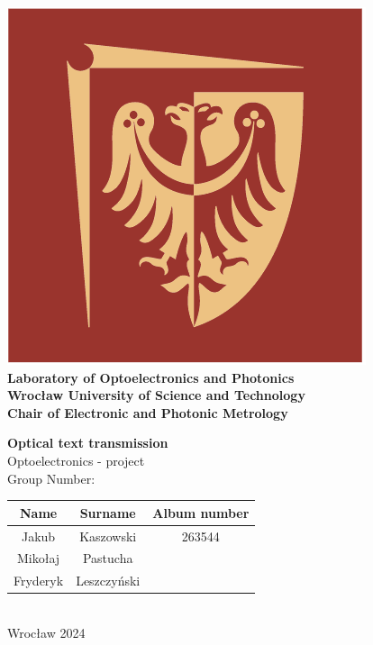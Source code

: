 \documentclass[12pt]{article}
\def\thetitle{Optical text transmission}
\begin{document}
	\begin{titlepage}
		\begin{center}
			\includegraphics[scale=0.3]{img/pwr.png}\\
			\vspace{20pt}
			\textbf{Laboratory of Optoelectronics and Photonics} \\
			\textbf{Wrocław University of Science and Technology} \\
			\textbf{Chair of Electronic and Photonic Metrology}
			
			\vspace{20pt}
		
		\textbf{\huge\thetitle} \\
		\vspace{5pt}
		\Large Optoelectronics - project \\
		\vspace{20pt}
		\normalsize
		Group Number: \\
		
		\begin{tabular}{ |c|c|c| } 
			\hline
			Name & Surname & Album number \\ \hline
			Jakub & Kaszowski & 263544 \\ \hline
			Mikołaj & Pastucha & \\ \hline
			Fryderyk & Leszczyński & \\
			\hline
		\end{tabular} \\
		\vspace{5pt}
		Wrocław 2024 \\

		\end{center}
		
	\end{titlepage}	
  \newpage
	\tableofcontents{\thispagestyle{fancyplain}}
  \newpage
	
\end{document}
